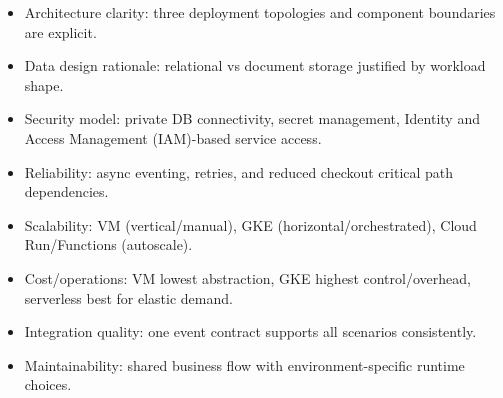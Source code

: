 \documentclass[
]{article}
\providecommand{\tightlist}{%
  \setlength{\itemsep}{0pt}\setlength{\parskip}{0pt}}
\begin{document}
\begin{itemize}
\tightlist
\item
  Architecture clarity: three deployment topologies and component
  boundaries are explicit.
\item
  Data design rationale: relational vs document storage justified by
  workload shape.
\item
  Security model: private DB connectivity, secret management, Identity
  and Access Management (IAM)-based service access.
\item
  Reliability: async eventing, retries, and reduced checkout critical
  path dependencies.
\item
  Scalability: VM (vertical/manual), GKE (horizontal/orchestrated),
  Cloud Run/Functions (autoscale).
\item
  Cost/operations: VM lowest abstraction, GKE highest control/overhead,
  serverless best for elastic demand.
\item
  Integration quality: one event contract supports all scenarios
  consistently.
\item
  Maintainability: shared business flow with environment-specific
  runtime choices.
\end{itemize}
\end{document}

